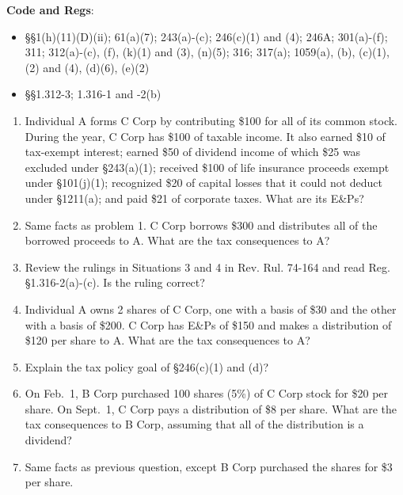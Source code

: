 \documentclass[12pt]{article}
\begin{document}
	\textbf{Code and Regs}: 
		\begin{itemize}
				\item
					\S\S 1(h)(11)(D)(ii); 61(a)(7); 243(a)-(c); 246(c)(1) and (4); 246A;  301(a)-(f); 311;  312(a)-(c), (f), (k)(1) and (3), (n)(5); 316; 317(a); 1059(a), (b), (c)(1), (2) and (4), (d)(6), (e)(2)
				\item
					\S\S 1.312-3; 1.316-1 and -2(b) \\
		\end{itemize}

	

\begin{enumerate}


	\item Individual A forms C Corp by contributing \$100 for all of its common stock. During the year, C Corp has \$100 of taxable income.  It also earned \$10 of tax-exempt interest; earned \$50 of dividend income of which \$25 was excluded under \S 243(a)(1); received \$100 of life insurance proceeds exempt under \S101(j)(1); recognized \$20 of capital losses that it could not deduct under \S1211(a); and paid \$21 of corporate taxes.  What are its E\&Ps?
	
	\item Same facts as problem 1.  C Corp  borrows \$300 and distributes all of the borrowed proceeds to A.  What are the tax consequences to A?

	\item Review the rulings in Situations 3 and 4 in Rev. Rul. 74-164 and read Reg. \S1.316-2(a)-(c).  Is the ruling correct?
	
	\item Individual A owns 2 shares of C Corp, one with a basis of \$30 and the other with a basis of \$200.  C Corp has E\&Ps of \$150 and makes a distribution of \$120 per share to A.  What are the tax consequences to A?
	
	\item Explain the tax policy goal of \S246(c)(1) and (d)? 

	\item	On Feb.\ 1, B Corp purchased 100 shares (5\%) of C Corp stock for \$20 per share.  On Sept.\ 1, C Corp pays a distribution of \$8 per share.  What are the tax consequences to B Corp, assuming that all of the distribution is a dividend?
	
	\item 	Same facts as previous question, except B Corp purchased the shares for \$3 per share.  
	

\end{enumerate}
\end{document}
